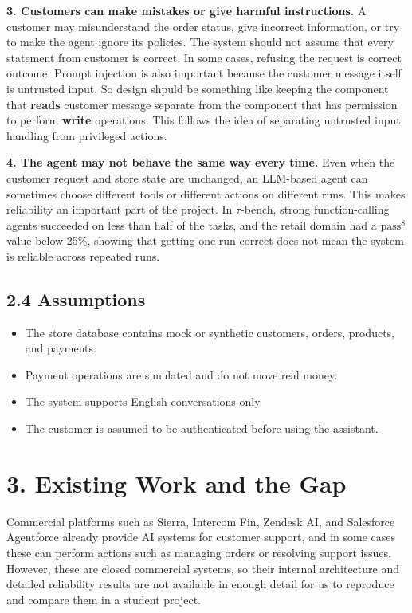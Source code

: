 \documentclass[11pt,a4paper]{article}
\begin{document}
\textbf{3. Customers can make mistakes or give harmful instructions.}
A customer may misunderstand the order status, give incorrect information, or try to make the agent ignore its policies. The system should not assume that every statement from customer is correct. In some cases, refusing the request is correct outcome. Prompt injection is also important because the customer message itself is untrusted input. So design shpuld be something like keeping the component that \textbf{reads} customer message separate from the component that has permission to perform \textbf{write} operations. This follows the idea of separating untrusted input handling from privileged actions. \cite{injection}

\textbf{4. The agent may not behave the same way every time.}
Even when the customer request and store state are unchanged, an LLM-based agent can sometimes choose different tools or different actions on different runs. This makes reliability an important part of the project. In $\tau$-bench, strong function-calling agents succeeded on less than half of the tasks, and the retail domain had a $\mathrm{pass}^8$ value below 25\%, showing that getting one run correct does not mean the system is reliable across repeated runs. \cite{taubench}

\subsection*{2.4 Assumptions}

\begin{itemize}
    \item The store database contains mock or synthetic customers, orders, products, and payments.
    \item Payment operations are simulated and do not move real money.
    \item The system supports English conversations only.
    \item The customer is assumed to be authenticated before using the assistant.
\end{itemize}

\section*{3. Existing Work and the Gap}

Commercial platforms such as Sierra, Intercom Fin, Zendesk AI, and Salesforce Agentforce already provide AI systems for customer support, and in some cases these can perform actions such as managing orders or resolving support issues. \cite{commercial} However, these are closed commercial systems, so their internal architecture and detailed reliability results are not available in enough detail for us to reproduce and compare them in a student project.
\end{document}
